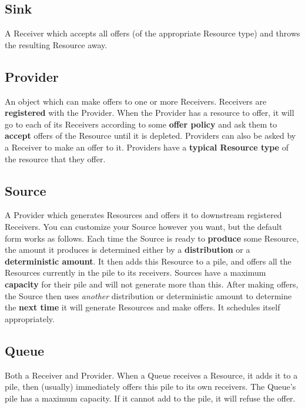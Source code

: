 \documentclass[twoside,10pt]{book}
\begin{document}
\subsection{Sink}

A Receiver which accepts all offers (of the appropriate Resource type) and throws the resulting Resource away.

\subsection{Provider}

An object which can make offers to one or more Receivers.  Receivers are {\bf registered} with the Provider.  When the Provider has a resource to offer, it will go to each of its Receivers according to some {\bf offer policy} and ask them to {\bf accept} offers of the Resource until it is depleted.  Providers can also be asked by a Receiver to make an offer to it.    Providers have a {\bf typical Resource type} of the resource that they offer.

\subsection{Source}

A Provider which generates Resources and offers it to downstream registered Receivers.  You can customize your Source however you want, but the default form works as follows.  Each time the Source is ready to {\bf produce} some Resource, the amount it produces is determined either by a {\bf distribution} or a {\bf deterministic amount}.  It then adds this Resource to a pile, and offers all the Resources currently in the pile to its receivers.  Sources have a maximum {\bf capacity} for their pile and will not generate more than this.  After making offers, the Source then uses {\it another} distribution or deterministic amount to determine the {\bf next time} it will generate Resources and make offers.  It schedules itself appropriately.

\subsection{Queue}

Both a Receiver and Provider.  When a Queue receives a Resource, it adds it to a pile, then (usually) immediately offers this pile to its own receivers.  The Queue's pile has a maximum capacity.  If it cannot add to the pile, it will refuse the offer.
\end{document}
